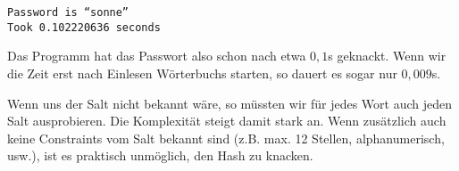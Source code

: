 \documentclass[a4paper,11pt]{scrartcl}
\begin{document}
\begin{enumerate}[1.]
        \texttt{Password is ``sonne''}\\
        \texttt{Took 0.102220636 seconds}

        Das Programm hat das Passwort also schon nach etwa $0,1$s geknackt. Wenn
        wir die Zeit erst nach Einlesen Wörterbuchs starten, so dauert es sogar
        nur $0,009$s.

        Wenn uns der Salt nicht bekannt wäre, so müssten wir für jedes Wort auch
        jeden Salt ausprobieren. Die Komplexität steigt damit stark an. Wenn
        zusätzlich auch keine Constraints vom Salt bekannt sind (z.B. max. 12
        Stellen, alphanumerisch, usw.), ist es praktisch unmöglich, den Hash zu
        knacken.
\end{enumerate}
\end{document}

